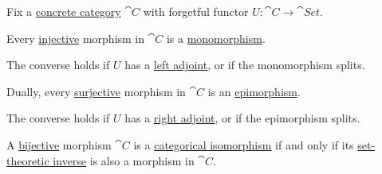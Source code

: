 \begin{proposition}\label{thm:concrete_category_function_invertibility}
  Fix a \hyperref[def:concrete_category]{concrete category} \( \cat{C} \) with forgetful functor \( U: \cat{C} \to \cat{Set} \).

  \begin{thmenum}
     Every \hyperref[def:function_invertibility/injective]{injective} morphism in \( \cat{C} \) is a \hyperref[def:morphism_cancellation/left]{monomorphism}.

    The converse holds if \( U \) has a \hyperref[def:category_adjunction]{left adjoint}, or if the monomorphism splits.

     Dually, every \hyperref[def:function_invertibility/surjective]{surjective} morphism in \( \cat{C} \) is an \hyperref[def:morphism_cancellation/right]{epimorphism}.

    The converse holds if \( U \) has a \hyperref[def:category_adjunction]{right adjoint}, or if the epimorphism splits.

     A \hyperref[def:function_invertibility/bijective]{bijective} morphism \( \cat{C} \) is a \hyperref[def:morphism_invertibility/isomorphism]{categorical isomorphism} if and only if its \hyperref[def:set_valued_map/inverse]{set-theoretic inverse} is also a morphism in \( \cat{C} \).
  \end{thmenum}
\end{proposition}
